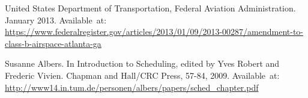 \begin{thebibliography}{1}
United States Department of Transportation, Federal Aviation Administration.
 January 2013.
\newblock Available~at: \url{https://www.federalregister.gov/articles/2013/01/09/2013-00287/amendment-to-class-b-airspace-atlanta-ga}

Susanne Albers. 
\newblock In Introduction to Scheduling, edited by Yves Robert and Frederic Vivien. 
\newblock Chapman and Hall/CRC Press, 57-84, 2009.
\newblock Available~at: \url{http://www14.in.tum.de/personen/albers/papers/sched_chapter.pdf}

\end{thebibliography}
\newpage
